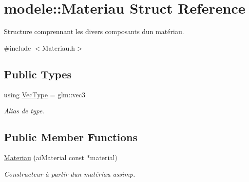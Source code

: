 \hypertarget{structmodele_1_1_materiau}{}\section{modele\+:\+:Materiau Struct Reference}
\label{structmodele_1_1_materiau}


Structure comprennant les divers composants d\textquotesingle{}un matériau.  




{\ttfamily \#include $<$Materiau.\+h$>$}

\subsection*{Public Types}
\begin{DoxyCompactItemize}
\item 
\hypertarget{structmodele_1_1_materiau_a78b750424a82862ce601e47045027a88}{}using \hyperlink{structmodele_1_1_materiau_a78b750424a82862ce601e47045027a88}{Vec\+Type} = glm\+::vec3\label{structmodele_1_1_materiau_a78b750424a82862ce601e47045027a88}

\begin{DoxyCompactList}\small\item\em Alias de type. \end{DoxyCompactList}\end{DoxyCompactItemize}
\subsection*{Public Member Functions}
\begin{DoxyCompactItemize}
\item 
\hyperlink{group__rendering_ga10d9cab94019fabdd02e8bfc85df772f}{Materiau} (ai\+Material const $\ast$material)
\begin{DoxyCompactList}\small\item\em Constructeur à partir d\textquotesingle{}un matériau assimp. \end{DoxyCompactList}\end{DoxyCompactItemize}
